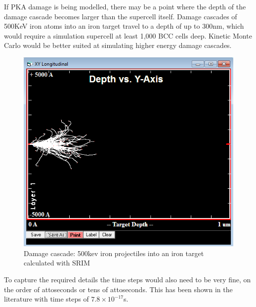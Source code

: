 If PKA damage is being modelled, there may be a point where the depth of the damage cascade becomes larger than the supercell itself.  Damage cascades of 500KeV iron atoms into an iron target travel to a depth of up to 300nm, which would require a simulation supercell at least 1,000 BCC cells deep.  Kinetic Monte Carlo would be better suited at simulating higher energy damage cascades.   

\begin{figure}[h]
  \begin{center}
    \includegraphics[width=.6\linewidth]{chapters/background_potential_fitting/plots/fe500kev.png}
    \caption{Damage cascade: 500kev iron projectiles into an iron target calculated with SRIM}
    \label{graph:fe500kev}
  \end{center}
\end{figure}

To capture the required details the time steps would also need to be very fine, on the order of attoseconds or tens of attoseconds.  This has been shown in the literature with time steps of $7.8 \times 10^{-17}$s\cite{moxlammpsdamage}.













